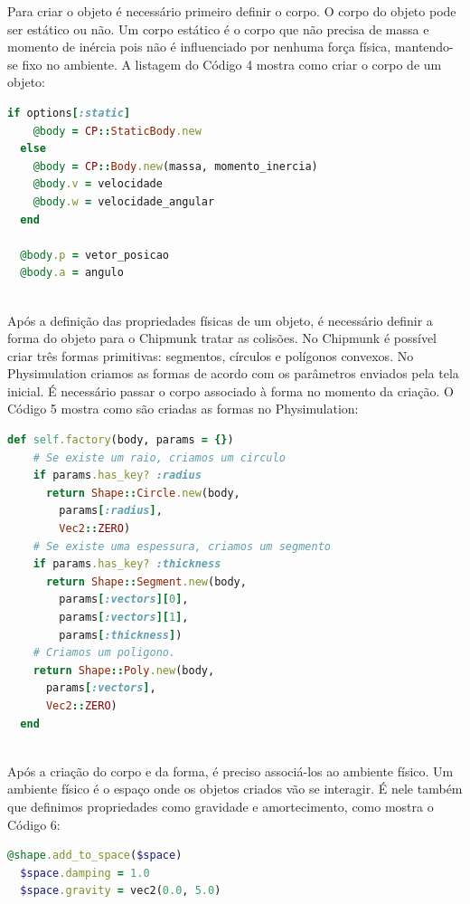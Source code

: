 Para criar o objeto é necessário primeiro definir o corpo. O corpo do objeto pode ser estático ou não. Um corpo estático é o corpo que não precisa de
massa e momento de inércia pois não é influenciado por nenhuma força física, mantendo-se fixo no ambiente. A listagem do Código 4 mostra como criar o corpo de um objeto:

\begin{lstlisting}[language=Ruby, caption=physics.rb]
  if options[:static]
    @body = CP::StaticBody.new
  else
    @body = CP::Body.new(massa, momento_inercia)
    @body.v = velocidade
    @body.w = velocidade_angular
  end

  @body.p = vetor_posicao
  @body.a = angulo
\end{lstlisting} 

\ \\
\hspace*{14pt} Após a definição das propriedades físicas de um objeto, é necessário definir a forma do objeto para o Chipmunk tratar as colisões. No Chipmunk é 
possível criar três formas primitivas: segmentos, círculos e polígonos convexos. No Physimulation criamos as formas de acordo com os parâmetros enviados
pela tela inicial. É necessário passar o corpo associado à forma no momento da criação. O Código 5 mostra como são criadas as formas no Physimulation:

\newpage

\begin{lstlisting}[language=Ruby, caption=physics.rb]
  def self.factory(body, params = {})
    # Se existe um raio, criamos um circulo
    if params.has_key? :radius
      return Shape::Circle.new(body, 
        params[:radius], 
        Vec2::ZERO)
    # Se existe uma espessura, criamos um segmento
    if params.has_key? :thickness
      return Shape::Segment.new(body, 
        params[:vectors][0], 
        params[:vectors][1], 
        params[:thickness])
    # Criamos um poligono.
    return Shape::Poly.new(body, 
      params[:vectors], 
      Vec2::ZERO)
  end
\end{lstlisting} 

\ \\
\hspace*{14pt} Após a criação do corpo e da forma, é preciso associá-los ao ambiente físico. Um ambiente físico é o espaço onde os objetos criados vão se interagir. É 
nele também que definimos propriedades como gravidade e amortecimento, como mostra o Código 6:

\begin{lstlisting}[language=Ruby, caption=physics.rb]
  @shape.add_to_space($space)
  $space.damping = 1.0
  $space.gravity = vec2(0.0, 5.0)
\end{lstlisting}


